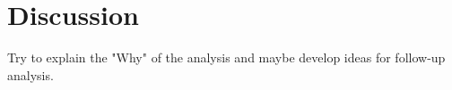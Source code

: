 \section{Discussion}

Try to explain the "Why" of the analysis and maybe develop ideas for follow-up analysis.
  
  